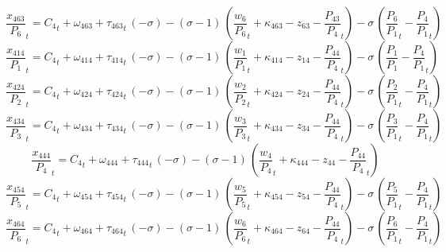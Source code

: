 \begin{dmath}
{{\frac{x_{463}}{P_{6}}}}_{t}={{C_{4}}}_{t}+{{\omega_{463}}}+{{\tau_{463}}}_{t}\, \left(-{{\sigma}}\right)-\left({{\sigma}}-1\right)\, \left({{\frac{w_{6}}{P_{6}}}}_{t}+{{\kappa_{463}}}-{{z_{63}}}-{{\frac{P_{43}}{P_{4}}}}_{t}\right)-{{\sigma}}\, \left({{\frac{P_{6}}{P_{1}}}}_{t}-{{\frac{P_{4}}{P_{1}}}}_{t}\right)
\end{dmath}
\begin{dmath}
{{\frac{x_{414}}{P_{1}}}}_{t}={{C_{4}}}_{t}+{{\omega_{414}}}+{{\tau_{414}}}_{t}\, \left(-{{\sigma}}\right)-\left({{\sigma}}-1\right)\, \left({{\frac{w_{1}}{P_{1}}}}_{t}+{{\kappa_{414}}}-{{z_{14}}}-{{\frac{P_{44}}{P_{4}}}}_{t}\right)-{{\sigma}}\, \left({{\frac{P_{1}}{P_{1}}}}-{{\frac{P_{4}}{P_{1}}}}_{t}\right)
\end{dmath}
\begin{dmath}
{{\frac{x_{424}}{P_{2}}}}_{t}={{C_{4}}}_{t}+{{\omega_{424}}}+{{\tau_{424}}}_{t}\, \left(-{{\sigma}}\right)-\left({{\sigma}}-1\right)\, \left({{\frac{w_{2}}{P_{2}}}}_{t}+{{\kappa_{424}}}-{{z_{24}}}-{{\frac{P_{44}}{P_{4}}}}_{t}\right)-{{\sigma}}\, \left({{\frac{P_{2}}{P_{1}}}}_{t}-{{\frac{P_{4}}{P_{1}}}}_{t}\right)
\end{dmath}
\begin{dmath}
{{\frac{x_{434}}{P_{3}}}}_{t}={{C_{4}}}_{t}+{{\omega_{434}}}+{{\tau_{434}}}_{t}\, \left(-{{\sigma}}\right)-\left({{\sigma}}-1\right)\, \left({{\frac{w_{3}}{P_{3}}}}_{t}+{{\kappa_{434}}}-{{z_{34}}}-{{\frac{P_{44}}{P_{4}}}}_{t}\right)-{{\sigma}}\, \left({{\frac{P_{3}}{P_{1}}}}_{t}-{{\frac{P_{4}}{P_{1}}}}_{t}\right)
\end{dmath}
\begin{dmath}
{{\frac{x_{444}}{P_{4}}}}_{t}={{C_{4}}}_{t}+{{\omega_{444}}}+{{\tau_{444}}}_{t}\, \left(-{{\sigma}}\right)-\left({{\sigma}}-1\right)\, \left({{\frac{w_{4}}{P_{4}}}}_{t}+{{\kappa_{444}}}-{{z_{44}}}-{{\frac{P_{44}}{P_{4}}}}_{t}\right)
\end{dmath}
\begin{dmath}
{{\frac{x_{454}}{P_{5}}}}_{t}={{C_{4}}}_{t}+{{\omega_{454}}}+{{\tau_{454}}}_{t}\, \left(-{{\sigma}}\right)-\left({{\sigma}}-1\right)\, \left({{\frac{w_{5}}{P_{5}}}}_{t}+{{\kappa_{454}}}-{{z_{54}}}-{{\frac{P_{44}}{P_{4}}}}_{t}\right)-{{\sigma}}\, \left({{\frac{P_{5}}{P_{1}}}}_{t}-{{\frac{P_{4}}{P_{1}}}}_{t}\right)
\end{dmath}
\begin{dmath}
{{\frac{x_{464}}{P_{6}}}}_{t}={{C_{4}}}_{t}+{{\omega_{464}}}+{{\tau_{464}}}_{t}\, \left(-{{\sigma}}\right)-\left({{\sigma}}-1\right)\, \left({{\frac{w_{6}}{P_{6}}}}_{t}+{{\kappa_{464}}}-{{z_{64}}}-{{\frac{P_{44}}{P_{4}}}}_{t}\right)-{{\sigma}}\, \left({{\frac{P_{6}}{P_{1}}}}_{t}-{{\frac{P_{4}}{P_{1}}}}_{t}\right)
\end{dmath}
